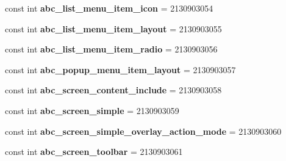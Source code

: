 \begin{DoxyCompactItemize}
\item 
\mbox{\label{class_pinned_app_1_1_droid_1_1_resource_1_1_layout_ac7dd3170df616f59d5d4d44570fc4895}} 
const int {\bfseries abc\+\_\+list\+\_\+menu\+\_\+item\+\_\+icon} = 2130903054
\item 
\mbox{\label{class_pinned_app_1_1_droid_1_1_resource_1_1_layout_a1576f063e6c7ccf8896ff3fa81f663ae}} 
const int {\bfseries abc\+\_\+list\+\_\+menu\+\_\+item\+\_\+layout} = 2130903055
\item 
\mbox{\label{class_pinned_app_1_1_droid_1_1_resource_1_1_layout_a78f7321aeafbe6e6830f98ff604ddfb5}} 
const int {\bfseries abc\+\_\+list\+\_\+menu\+\_\+item\+\_\+radio} = 2130903056
\item 
\mbox{\label{class_pinned_app_1_1_droid_1_1_resource_1_1_layout_a34019b535ea73e375aeb87b298c9ca06}} 
const int {\bfseries abc\+\_\+popup\+\_\+menu\+\_\+item\+\_\+layout} = 2130903057
\item 
\mbox{\label{class_pinned_app_1_1_droid_1_1_resource_1_1_layout_a2d866fb17d4e2ff36a25947ae1b4120e}} 
const int {\bfseries abc\+\_\+screen\+\_\+content\+\_\+include} = 2130903058
\item 
\mbox{\label{class_pinned_app_1_1_droid_1_1_resource_1_1_layout_aae84259f5b066563f2eca8ff54e64049}} 
const int {\bfseries abc\+\_\+screen\+\_\+simple} = 2130903059
\item 
\mbox{\label{class_pinned_app_1_1_droid_1_1_resource_1_1_layout_a12eecdd944642fcbeb2548e79e8a56e4}} 
const int {\bfseries abc\+\_\+screen\+\_\+simple\+\_\+overlay\+\_\+action\+\_\+mode} = 2130903060
\item 
\mbox{\label{class_pinned_app_1_1_droid_1_1_resource_1_1_layout_a4ca8713640bb472c188403f858daa0b1}} 
const int {\bfseries abc\+\_\+screen\+\_\+toolbar} = 2130903061
\item 

\end{DoxyCompactItemize}
